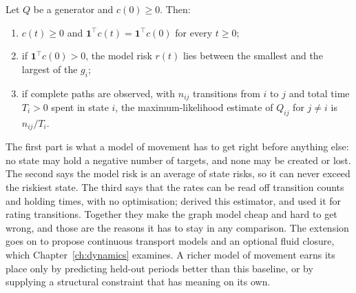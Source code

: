 \begin{proposition}\label{c19:prop-graph}
Let $Q$ be a generator and $c(0)\ge0$. Then:
\begin{enumerate}
\item $c(t)\ge0$ and $\mathbf 1^\top c(t)=\mathbf 1^\top c(0)$ for every $t\ge0$;
\item if $\mathbf 1^\top c(0)>0$, the model risk $r(t)$ lies between the smallest and the largest of the $g_i$;
\item if complete paths are observed, with $n_{ij}$ transitions from $i$ to $j$ and total time $T_i>0$ spent in
state $i$, the maximum-likelihood estimate of $Q_{ij}$ for $j\ne i$ is $n_{ij}/T_i$.
\end{enumerate}
\end{proposition}

The first part is what a model of movement has to get right before anything else: no
state may hold a negative number of targets, and none may be created or lost. The second
says the model risk is an average of state risks, so it can never exceed the riskiest state.
The third says that the rates can be read off transition counts and holding times, with no
optimisation; \citet{albert1962} derived this estimator, and \citet{lando2002} used it
for rating transitions. Together they make the graph model cheap and hard to get wrong,
and those are the reasons it has to stay in any comparison. The extension goes on to propose
continuous transport models and an optional fluid closure, which Chapter~\ref{ch:dynamics} examines. A
richer model of movement earns its place only by predicting held-out periods better than
this baseline, or by supplying a structural constraint that has meaning on its own.

